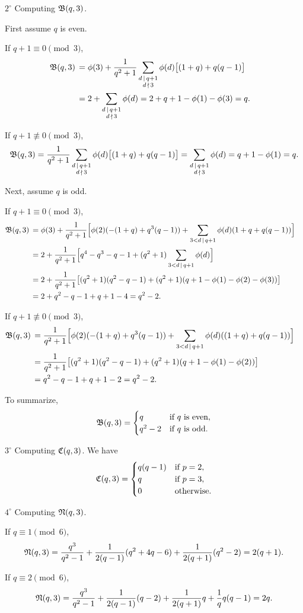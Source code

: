 \documentclass{amsart}
\numberwithin{equation}{section}
\theoremstyle{definition}
\begin{document}
\medskip
$2^\circ$ Computing $\frak B(q,3)$.

First assume $q$ is even.

If $q+1\equiv 0\pmod 3$,
\begin{align*}
\frak B(q,3)\,&=\phi(3)+\frac 1{q^2+1}\sum_{\substack{d\,\mid\, q+1\cr d\,\nmid\, 3}}\phi(d)\bigl[(1+q)+q(q-1)\bigr]\cr
&=2+\sum_{\substack{d\,\mid\, q+1\cr d\,\nmid\, 3}}\phi(d)=2+q+1-\phi(1)-\phi(3)=q.
\end{align*}

If $q+1\not\equiv 0\pmod 3$,
\[
\frak B(q,3)=\frac 1{q^2+1}\sum_{\substack{d\,\mid\, q+1\cr d\,\nmid\, 3}}\phi(d)\bigl[(1+q)+q(q-1)\bigr]=\sum_{\substack{d\,\mid\, q+1\cr d\,\nmid\, 3}}\phi(d)=q+1-\phi(1)=q.
\]

\medskip
Next, assume $q$ is odd.

If $q+1\equiv 0\pmod 3$,
\begin{align*}
\frak B(q,3)\,&=\phi(3)+\frac 1{q^2+1}\Bigl[\phi(2)(-(1+q)+q^3(q-1))+\sum_{3<d\,\mid\, q+1}\phi(d)(1+q+q(q-1))\Bigr]\cr
&=2+\frac 1{q^2+1}\Bigl[q^4-q^3-q-1+(q^2+1)\sum_{3<d\,\mid\, q+1}\phi(d)\Bigr]\cr
&=2+\frac 1{q^2+1}\bigl[(q^2+1)(q^2-q-1)+(q^2+1)(q+1-\phi(1)-\phi(2)-\phi(3))\bigr]\cr
&=2+q^2-q-1+q+1-4=q^2-2.
\end{align*}

If $q+1\not\equiv 0\pmod 3$,
\begin{align*}
\frak B(q,3)\,&=\frac 1{q^2+1}\Bigl[\phi(2)(-(1+q)+q^3(q-1))+\sum_{3<d\,\mid\, q+1}\phi(d)((1+q)+q(q-1))\Bigr]\cr
&=\frac 1{q^2+1}\bigl[(q^2+1)(q^2-q-1)+(q^2+1)(q+1-\phi(1)-\phi(2))\bigr]\cr
&=q^2-q-1+q+1-2=q^2-2.
\end{align*}

To summarize,
\[
\frak B(q,3)=\begin{cases}
q&\text{if $q$ is even},\cr
q^2-2&\text{if $q$ is odd}.
\end{cases}
\]

\medskip
$3^\circ$ Computing $\frak C(q,3)$. We have
\[
\frak C(q,3)=\begin{cases}
q(q-1)&\text{if}\ p=2,\cr
q&\text{if}\ p=3,\cr
0&\text{otherwise}.
\end{cases}
\]

\medskip
$4^\circ$ Computing $\frak N(q,3)$.

\medskip
If $q\equiv 1\pmod 6$,
\[
\frak N(q,3)=\frac{q^3}{q^2-1}+\frac 1{2(q-1)}(q^2+4q-6)+\frac 1{2(q+1)}(q^2-2)=2(q+1).
\]

\medskip
If $q\equiv 2\pmod 6$,
\[
\frak N(q,3)=\frac{q^3}{q^2-1}+\frac 1{2(q-1)}(q-2)+\frac 1{2(q+1)}q+\frac 1qq(q-1)=2q.
\]
\end{document}
